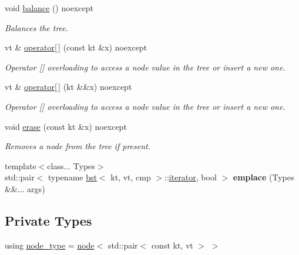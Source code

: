 \begin{DoxyCompactItemize}
void \hyperlink{classbst_a4ac74357616de45d5d3e7cbb9850854e}{balance} () noexcept
\begin{DoxyCompactList}\small\item\em Balances the tree. \end{DoxyCompactList}\item 
vt \& \hyperlink{classbst_ae9b1b8ff05ece0ac05e8dfca244e556e}{operator\mbox{[}$\,$\mbox{]}} (const kt \&x) noexcept
\begin{DoxyCompactList}\small\item\em Operator \mbox{[}\mbox{]} overloading to access a node value in the tree or insert a new one. \end{DoxyCompactList}\item 
vt \& \hyperlink{classbst_a024d828ac753881e50cd7cc93a47a3cc}{operator\mbox{[}$\,$\mbox{]}} (kt \&\&x) noexcept
\begin{DoxyCompactList}\small\item\em Operator \mbox{[}\mbox{]} overloading to access a node value in the tree or insert a new one. \end{DoxyCompactList}\item 
void \hyperlink{classbst_af5ed588b2c686b3b53a2b5466a617f73}{erase} (const kt \&x) noexcept
\begin{DoxyCompactList}\small\item\em Removes a node from the tree if present. \end{DoxyCompactList}\item 
\mbox{\label{classbst_afcc3983e4d16eaa758aec0adb71759bb}} 
{\footnotesize template$<$class... Types$>$ }\\std\+::pair$<$ typename \hyperlink{classbst}{bst}$<$ kt, vt, cmp $>$\+::\hyperlink{classbst_a429b0445783ff6486882db5dee900ce0}{iterator}, bool $>$ {\bfseries emplace} (Types \&\&... args)
\end{DoxyCompactItemize}
\subsection*{Private Types}
\begin{DoxyCompactItemize}
\item 
using \hyperlink{classbst_a062eb2a1ac54802dbc4f0f74ae2afd01}{node\+\_\+type} = \hyperlink{structbst_1_1node}{node}$<$ std\+::pair$<$ const kt, vt $>$ $>$
\end{DoxyCompactItemize}
